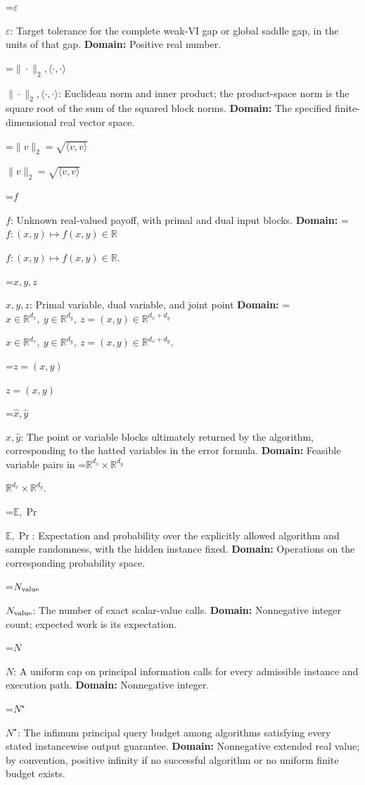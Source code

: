 \documentclass[10pt,a4paper]{article}
\newcommand{\AtlasMath}[1]{\par\begingroup\centering\setbox0=\hbox{$\displaystyle #1$}\ifdim\wd0>1.4\linewidth\typeout{ATLAS WIDE FORMULA: \the\wd0}\fi\ifdim\wd0>\linewidth\resizebox{\linewidth}{!}{\box0}\else\box0\fi\par\endgroup}
\newcommand{\AtlasInlineMath}[1]{\begingroup\setbox0=\hbox{$#1$}\ifdim\wd0>.4\linewidth\endgroup\AtlasMath{#1}\else\endgroup$#1$\fi}
\begin{document}
\AtlasInlineMath{\varepsilon}: Target tolerance for the complete weak-VI gap or global saddle gap, in the units of that gap. \textbf{Domain:} Positive real number.



\AtlasInlineMath{\|\cdot\|_2,\langle\cdot,\cdot\rangle}: Euclidean norm and inner product; the product-space norm is the square root of the sum of the squared block norms. \textbf{Domain:} The specified finite-dimensional real vector space.



\AtlasInlineMath{\|v\|_2=\sqrt{\langle v,v\rangle}}



\AtlasInlineMath{f}: Unknown real-valued payoff, with primal and dual input blocks. \textbf{Domain:} \AtlasInlineMath{f:(x,y)\mapsto f(x,y)\in\mathbb R}.



\AtlasInlineMath{x,y,z}: Primal variable, dual variable, and joint point \textbf{Domain:} \AtlasInlineMath{x\in\mathbb R^{d_x},\ y\in\mathbb R^{d_y},\ z=(x,y)\in\mathbb R^{d_x+d_y}}.



\AtlasInlineMath{z=(x,y)}



\AtlasInlineMath{\widehat x,\widehat y}: The point or variable blocks ultimately returned by the algorithm, corresponding to the hatted variables in the error formula. \textbf{Domain:} Feasible variable pairs in \AtlasInlineMath{\mathbb R^{d_x}\times\mathbb R^{d_y}}.



\AtlasInlineMath{\mathbb E,\Pr}: Expectation and probability over the explicitly allowed algorithm and sample randomness, with the hidden instance fixed. \textbf{Domain:} Operations on the corresponding probability space.



\AtlasInlineMath{N_{\rm value}}: The number of exact scalar-value calls. \textbf{Domain:} Nonnegative integer count; expected work is its expectation.



\AtlasInlineMath{N}: A uniform cap on principal information calls for every admissible instance and execution path. \textbf{Domain:} Nonnegative integer.



\AtlasInlineMath{N^\star}: The infimum principal query budget among algorithms satisfying every stated instancewise output guarantee. \textbf{Domain:} Nonnegative extended real value; by convention, positive infinity if no successful algorithm or no uniform finite budget exists.
\end{document}
